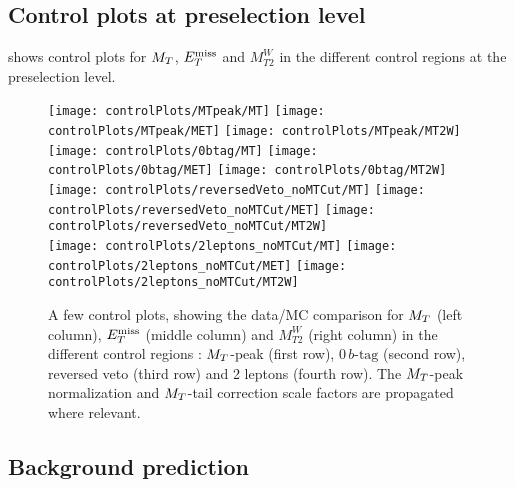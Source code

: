         \subsection{Control plots at preselection level}

         shows control plots for $M_T$, $E_T^\text{miss}$ and $M_{T2}^W$ in the different control regions at the preselection level. 

            \begin{figure}[h!]
                \centering
                \texttt{[image: controlPlots/MTpeak/MT]}
                \texttt{[image: controlPlots/MTpeak/MET]}
                \texttt{[image: controlPlots/MTpeak/MT2W]}\\
                \texttt{[image: controlPlots/0btag/MT]}
                \texttt{[image: controlPlots/0btag/MET]}
                \texttt{[image: controlPlots/0btag/MT2W]}\\
                \texttt{[image: controlPlots/reversedVeto\_noMTCut/MT]}
                \texttt{[image: controlPlots/reversedVeto\_noMTCut/MET]}
                \texttt{[image: controlPlots/reversedVeto\_noMTCut/MT2W]}\\
                \texttt{[image: controlPlots/2leptons\_noMTCut/MT]}
                \texttt{[image: controlPlots/2leptons\_noMTCut/MET]}
                \texttt{[image: controlPlots/2leptons\_noMTCut/MT2W]}\\
                \caption{A few control plots, showing the data/MC comparison for $M_T$ (left column),
                        $E_T^\text{miss}$ (middle column) and $M_{T2}^W$ (right column) in the different control
                        regions : $M_T$-peak (first row), $0\, b\text{-tag}$ (second row), reversed veto (third
                        row) and 2 leptons (fourth row). The $M_T$-peak normalization and $M_T$-tail
                        correction scale factors are propagated where relevant.}
                        \label{fig:preselControlPlots}
            \end{figure}

        \subsection{Background prediction}

